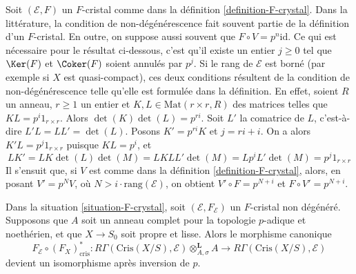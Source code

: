 \begin{remark}
\label{remark-F-crystal-variants}
Soit $(\mathcal{E}, F)$ un $F$-cristal comme dans la
définition \ref{definition-F-crystal}.
Dans la littérature, la condition de non-dégénérescence fait souvent partie de la
définition d'un $F$-cristal. En outre, on suppose aussi souvent que
$F \circ V = p^n\text{id}$. Ce qui est nécessaire pour le résultat ci-dessous, c'est
qu'il existe un entier $j \geq 0$ tel que $\Ker(F)$ et
$\Coker(F)$ soient annulés par $p^j$. Si le rang de $\mathcal{E}$
est borné (par exemple si $X$ est quasi-compact), ces deux
conditions résultent de la condition de non-dégénérescence telle qu'elle est formulée dans
la définition. En effet, soient $R$ un anneau, $r \geq 1$ un entier et
$K, L \in \text{Mat}(r \times r, R)$ des matrices telles que
$K L = p^i 1_{r \times r}$. Alors $\det(K)\det(L) = p^{ri}$. 
Soit $L'$ la comatrice de $L$, c'est-à-dire
$L' L = L L' = \det(L)$. Posons $K' = p^{ri} K$ et $j = ri + i$.
On a alors $K' L = p^j 1_{r \times r}$ puisque $K L = p^i$, et
$$
L K' = L K \det(L) \det(M) = L K L L' \det(M) = L p^i L' \det(M) =
p^j 1_{r \times r}
$$
Il s'ensuit que, si $V$ est comme dans la définition \ref{definition-F-crystal},
alors, en posant $V' = p^N V$, où $N > i \cdot \text{rang}(\mathcal{E})$,
on obtient $V' \circ F = p^{N + i}$ et $F \circ V' = p^{N + i}$.
\end{remark}

\begin{theorem}
\label{theorem-cohomology-F-crystal}
Dans la situation \ref{situation-F-crystal}, soit $(\mathcal{E}, F_\mathcal{E})$
un $F$-cristal non dégénéré. Supposons que $A$ soit un anneau complet pour la topologie $p$-adique
et noethérien, et que $X \to S_0$ soit propre et lisse. Alors
le morphisme canonique
$$
F_\mathcal{E} \circ (F_X)_{\text{cris}}^* :
R\Gamma(\text{Cris}(X/S), \mathcal{E}) \otimes^\mathbf{L}_{A, \sigma} A
\longrightarrow
R\Gamma(\text{Cris}(X/S), \mathcal{E})
$$
devient un isomorphisme après inversion de $p$.
\end{theorem}

